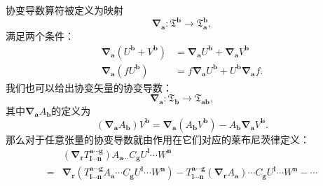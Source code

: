 协变导数算符被定义为映射
\begin{equation*}
	\boldsymbol{\nabla }_{\boldsymbol{a}} :\mathfrak{T}^{\boldsymbol{b}}\rightarrow \mathfrak{T}_{\boldsymbol{a}}^{\boldsymbol{b}} ,
\end{equation*}
满足两个条件：
\begin{equation*}
	\begin{aligned}
		\boldsymbol{\nabla }_{\boldsymbol{a}} (U^{\boldsymbol{b}} +V^{\boldsymbol{b}} ) & =\boldsymbol{\nabla }_{\boldsymbol{a}} U^{\boldsymbol{b}} +\boldsymbol{\nabla }_{\boldsymbol{a}} V^{\boldsymbol{b}}\\
		\boldsymbol{\nabla }_{\boldsymbol{a}} (fU^{\boldsymbol{b}} ) & =f\boldsymbol{\nabla }_{\boldsymbol{a}} U^{\boldsymbol{b}} +U^{\boldsymbol{b}}\boldsymbol{\nabla }_{\boldsymbol{a}} f.
	\end{aligned}
\end{equation*}
我们也可以给出协变矢量的协变导数：
\begin{equation*}
	\boldsymbol{\nabla }_{\boldsymbol{a}} :\mathfrak{T}_{\boldsymbol{b}}\rightarrow \mathfrak{T}_{\boldsymbol{ab}} ,
\end{equation*}
其中$\boldsymbol{\nabla }_{\boldsymbol{a}} A_{\boldsymbol{b}}$的定义为
\begin{equation*}
	(\boldsymbol{\nabla }_{\boldsymbol{a}} A_{\boldsymbol{b}} )V^{\boldsymbol{b}} =\boldsymbol{\nabla }_{\boldsymbol{a}} (A_{\boldsymbol{b}} V^{\boldsymbol{b}} )-A_{\boldsymbol{b}}\boldsymbol{\nabla }_{\boldsymbol{a}} V^{\boldsymbol{b}} .
\end{equation*}
那么对于任意张量的协变导数就由作用在它们对应的莱布尼茨律定义：
\begin{equation*}
	\begin{aligned}
		& (\boldsymbol{\nabla }_{\boldsymbol{r}} T_{\boldsymbol{l} \cdots \boldsymbol{n}}^{\boldsymbol{a} \cdots \boldsymbol{g}} )A_{\boldsymbol{a} \cdots } C_{\boldsymbol{g}} U^{\boldsymbol{l}} \cdots W^{\boldsymbol{n}}\\
		= & \boldsymbol{\nabla }_{\boldsymbol{r}} (T_{\boldsymbol{l} \cdots \boldsymbol{n}}^{\boldsymbol{a} \cdots \boldsymbol{g}} A_{\boldsymbol{a}} \cdots C_{\boldsymbol{g}} U^{\boldsymbol{l}} \cdots W^{\boldsymbol{n}} )-T_{\boldsymbol{l} \cdots \boldsymbol{n}}^{\boldsymbol{a} \cdots \boldsymbol{g}} (\boldsymbol{\nabla }_{\boldsymbol{r}} A_{\boldsymbol{a}} )\cdots C_{\boldsymbol{g}} U^{\boldsymbol{l}} \cdots W^{\boldsymbol{n}} -\cdots 
	\end{aligned}
\end{equation*}
